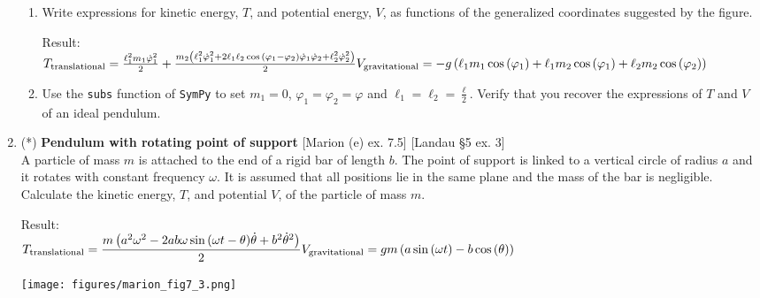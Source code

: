 \documentclass[11pt, a4paper, twoside]{article}
\begin{document}
\begin{enumerate}
	\begin{enumerate}
		\item Write expressions for kinetic energy, $T$, and potential energy, $V$, as functions of the generalized coordinates suggested by the figure.
		
		Result:\\
	\(
		T_\text{translational} = \frac{\ell_{1}^{2} m_{1} \dot{\varphi}_{1}^{2}}{2} + \frac{m_{2} \left(\ell_{1}^{2} \dot{\varphi}_{1}^{2} + 2 \ell_{1} \ell_{2} \cos{\left(\varphi_{1} - \varphi_{2} \right)} \dot{\varphi}_{1} \dot{\varphi}_{2} + \ell_{2}^{2} \dot{\varphi}_{2}^{2}\right)}{2}\\
		V_\text{gravitational} = - g \left(\ell_{1} m_{1} \cos{\left(\varphi_{1} \right)} + \ell_{1} m_{2} \cos{\left(\varphi_{1} \right)} + \ell_{2} m_{2} \cos{\left(\varphi_{2} \right)}\right)
	\)
		\item Use the \verb'subs' function of \verb'SymPy' to set $m_1=0$, $\varphi_1 = \varphi_2 = \varphi$ and  $\ell_1 = \ell_2 = \frac{\ell}{2}$. 
		Verify that you recover the expressions of $T$ and $V$ of an ideal pendulum.
	\end{enumerate}


\item
	\begin{minipage}[t][7.1cm]{0.5\textwidth}
		(*) \textbf{Pendulum with rotating point of support} [Marion (e) ex. 7.5] [Landau \S5 ex. 3]\\
		A particle of mass $m$ is attached to the end of a rigid bar of length $b$. The point of support is linked to a vertical circle of radius $a$ and it rotates with constant frequency $\omega$. It is assumed that all positions lie in the same plane and the mass of the bar is negligible. Calculate the kinetic energy, $T$, and potential $V$, of the particle of mass $m$.

		Result:\\
		\(
			T_\text{translational} = \dfrac{m \left(a^{2} \omega^{2} - 2 a b \omega \sin{\left(\omega t - \theta \right)} \dot{\theta} + b^{2} \dot{\theta}^{2}\right)}{2}\\
			V_\text{gravitational} = g m \left(a \sin{\left(\omega t \right)} - b \cos{\left(\theta \right)}\right)
		\)
	\end{minipage}
	\begin{minipage}[c][3cm][t]{0.5\textwidth}
		\texttt{[image: figures/marion\_fig7\_3.png]}
	\end{minipage}




\end{enumerate}
\end{document}
